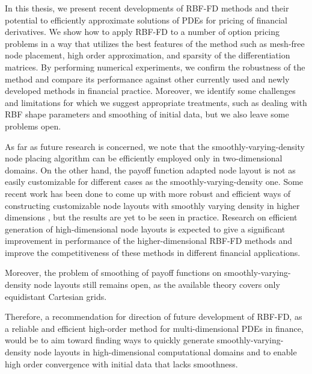 \documentclass{UUThesisTemplate}
\begin{document}
\par 
In this thesis, we present recent developments of RBF-FD methods and their potential to efficiently approximate solutions of PDEs for pricing of financial derivatives. We show how to apply RBF-FD to a number of option pricing problems in a way that utilizes the best features of the method such as mesh-free node placement, high order approximation, and sparsity of the differentiation matrices. By performing numerical experiments, we confirm the robustness of the method and compare its performance against other currently used and newly developed methods in financial practice. Moreover, we identify some challenges and limitations for which we suggest appropriate treatments, such as dealing with RBF shape parameters and smoothing of initial data, but we also leave some problems open.  

\par
As far as future research is concerned, we note that the smoothly-varying-density node placing algorithm can be efficiently employed only in two-dimensional domains. On the other hand, the payoff function adapted node layout is not as easily customizable for different cases as the smoothly-varying-density one. Some recent work has been done to come up with more robust and efficient ways of constructing customizable node layouts with smoothly varying density in higher dimensions \cite{vlasiuk2017fast}, but the results are yet to be seen in practice. Research on efficient generation of high-dimensional node layouts is expected to give a significant improvement in performance of the higher-dimensional RBF-FD methods and improve the competitiveness of these methods in different financial applications.

\par
Moreover, the problem of smoothing of payoff functions on smoothly-varying-density node layouts still remains open, as the available theory covers only equidistant Cartesian grids. 

\par
Therefore, a recommendation for direction of future development of RBF-FD, as a reliable and efficient high-order method for multi-dimensional PDEs in finance, would be to aim toward finding ways to quickly generate smoothly-varying-density node layouts in high-dimensional computational domains and to enable high order convergence with initial data that lacks smoothness.
\end{document}

